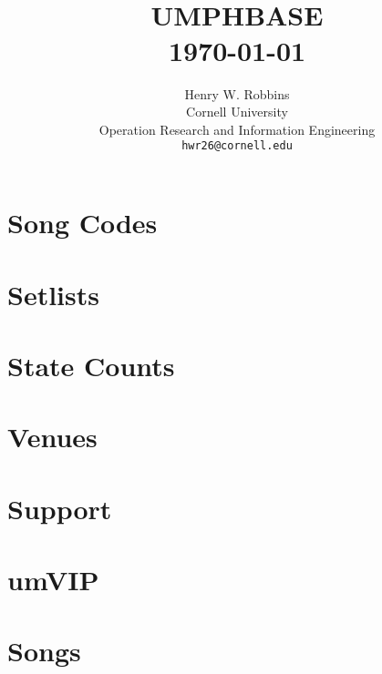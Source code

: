 \documentclass[8pt]{book}
\title{	\normalsize \textsc{} 					%
        \\[2.0cm]								
        \HRule{2pt} \\ [0.5cm]		
	\Huge \textbf{\uppercase{UMPHBASE}}	%
	\HRule{2pt} \\ [0.5cm]
	\large \today						%
}
\author{
	Henry W. Robbins\\	
	Cornell University\\	
	Operation Research and Information Engineering\\
        \texttt{hwr26@cornell.edu} \\
}
\makeatletter
\let\mcnewpage=\newpage
\newcommand{\TrickSupertabularIntoMulticols}{
\renewcommand\newpage{
    \if@firstcolumn
        \hrule width\linewidth height0pt
            \columnbreak
        \else
          \mcnewpage
        \fi
}}
\def\printtitle{%
    {\centering \@title\par}}
\def\printauthor{					
    {\centering \large \@author}}
\makeatother
\begin{document}
\thispagestyle{empty}		
\printtitle					
\vfill
\printauthor				
\newpage

\tableofcontents
\newpage

\chapter{Song Codes}

\begin{multicols*}{4}
 \let\mcnewpage=\newpage
     \makeatletter
     \renewcommand\newpage{
           \if@firstcolumn
                \hrule width \linewidth height0pt
                \columnbreak
            \else
                \mcnewpage
            \fi}
\begin{footnotesize}
%
\end{footnotesize}
\end{multicols*}

\chapter{Setlists}

%

\chapter{State Counts}

\begin{multicols*}{2}
\TrickSupertabularIntoMulticols
%
\end{multicols*}

\chapter{Venues}

\begin{multicols*}{3}
\TrickSupertabularIntoMulticols
%
\end{multicols*}
%

\chapter{Support}

\begin{multicols*}{3}
\TrickSupertabularIntoMulticols
%
\end{multicols*}

\chapter{umVIP}

%

\chapter{Songs}

\setlength{\columnseprule}{0.5pt}
\setlength{\tabcolsep}{3pt}
\begin{multicols*}{4}
\TrickSupertabularIntoMulticols
\begin{footnotesize}
%
\end{footnotesize}
\end{multicols*}
\end{document}

